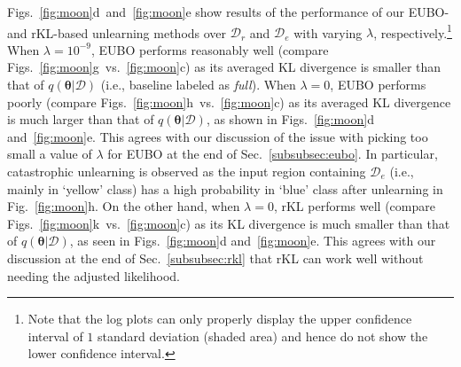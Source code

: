 \documentclass{article}
\theoremstyle{definition}
\newcommand{\mbf}[1]{\mathbf{#1}}
\newcommand{\mcl}[1]{\mathcal{#1}}
\newcommand{\da}{\mcl{D}}
\newcommand{\dc}{\mcl{D}_r}
\newcommand{\dr}{\mcl{D}_e}
\begin{document}
%
Figs.~\ref{fig:moon}d~and~\ref{fig:moon}e show results of the performance of our EUBO- and rKL-based unlearning methods over $\dc$ and $\dr$ with varying $\lambda$, respectively.\footnote{\label{log}Note that the log plots can only properly display the upper confidence interval of $1$ standard deviation (shaded area) and hence do not show the lower confidence interval.
}
When $\lambda = 10^{-9}$, EUBO performs reasonably well (compare Figs.~\ref{fig:moon}g~vs.~\ref{fig:moon}c) as its averaged KL divergence is smaller than that of $q(\bm{\theta}|\da)$ (i.e., baseline labeled as \emph{full}).
When $\lambda = 0$, EUBO performs poorly (compare Figs.~\ref{fig:moon}h~vs.~\ref{fig:moon}c) as its averaged KL divergence is much larger than that of $q(\bm{\theta}|\da)$, as shown in Figs.~\ref{fig:moon}d and~\ref{fig:moon}e.
This agrees with our discussion of the issue with picking too small a value of $\lambda$ for EUBO at the end of Sec.~\ref{subsubsec:eubo}.
In particular, catastrophic unlearning is observed as the input region containing $\dr$ (i.e., mainly in `yellow' class) has a high probability in `blue' class after unlearning in Fig.~\ref{fig:moon}h. 
On the other hand, when $\lambda = 0$, 
rKL performs well (compare Figs.~\ref{fig:moon}k~vs.~\ref{fig:moon}c) as its
KL divergence is much smaller than that of $q(\bm{\theta}|\da)$, as seen in  Figs.~\ref{fig:moon}d and~\ref{fig:moon}e. This agrees with our discussion at the end of Sec.~\ref{subsubsec:rkl} that rKL can work well without needing the adjusted likelihood. 
\end{document}
